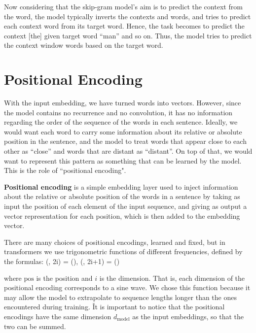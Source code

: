 Now considering that the skip-gram model's aim is to predict the context from the word, the model typically inverts
the contexts and words, and tries to predict each context word from its target word. Hence, the task becomes to predict
the context [the] given target word ``man'' and so on. Thus, the model tries to predict the context window words based
on the target word.
\vspace{-5pt}
\ee

\section{Positional Encoding}


With the input embedding, we have turned words into vectors. However, since the model contains no recurrence and no
convolution, it has no information regarding the order of the sequence of the words in each sentence. Ideally, we
would want each word to carry some information about its relative or absolute position in the sentence, and the
model to treat words that appear close to each other as ``close'' and words that are distant as ``distant''. On top
of that, we would want to represent this pattern as something that can be learned by the model. This is the role of
``positional encoding".

\textbf{Positional encoding} is a simple embedding layer used to inject information about the relative or absolute
position of the words in a sentence by taking as input the position of each element of the input sequence, and giving
as output a vector representation for each position, which is then added to the embedding vector.
\ed

There are many choices of positional encodings, learned and fixed, but in transformers we use trigonometric functions
of different frequencies, defined by the formulas:
\bse
{}(, 2i) = \sin\Bigg(\Bigg), \qquad
{}(, 2i+1) = \cos\Bigg(\Bigg)
\ese

where $\text{pos}$ is the position and $i$ is the dimension. That is, each dimension of the positional encoding
corresponds to a sine wave. We chose this function because it may allow the model to extrapolate to sequence lengths
longer than the ones encountered during training. \v

It is important to notice that the positional encodings have the same dimension $d_{\text{model}}$ as the input
embeddings, so that the two can be summed.

